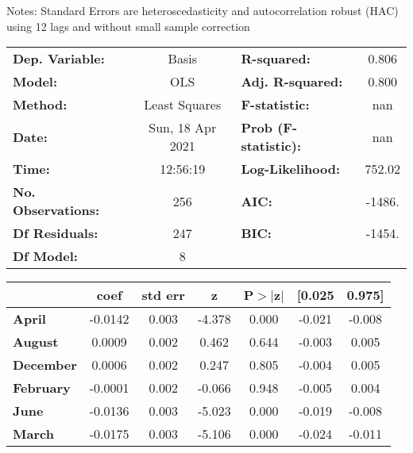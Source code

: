 Notes: \newline
 [1] Standard Errors are heteroscedasticity and autocorrelation robust (HAC) using 12 lags and without small sample correction
\begin{center}
\begin{tabular}{lclc}
\toprule
\textbf{Dep. Variable:}    &      Basis       & \textbf{  R-squared:         } &     0.806   \\
\textbf{Model:}            &       OLS        & \textbf{  Adj. R-squared:    } &     0.800   \\
\textbf{Method:}           &  Least Squares   & \textbf{  F-statistic:       } &       nan   \\
\textbf{Date:}             & Sun, 18 Apr 2021 & \textbf{  Prob (F-statistic):} &      nan    \\
\textbf{Time:}             &     12:56:19     & \textbf{  Log-Likelihood:    } &    752.02   \\
\textbf{No. Observations:} &         256      & \textbf{  AIC:               } &    -1486.   \\
\textbf{Df Residuals:}     &         247      & \textbf{  BIC:               } &    -1454.   \\
\textbf{Df Model:}         &           8      & \textbf{                     } &             \\
\bottomrule
\end{tabular}
\begin{tabular}{lcccccc}
                  & \textbf{coef} & \textbf{std err} & \textbf{z} & \textbf{P$> |$z$|$} & \textbf{[0.025} & \textbf{0.975]}  \\
\midrule
\textbf{April}    &      -0.0142  &        0.003     &    -4.378  &         0.000        &       -0.021    &       -0.008     \\
\textbf{August}   &       0.0009  &        0.002     &     0.462  &         0.644        &       -0.003    &        0.005     \\
\textbf{December} &       0.0006  &        0.002     &     0.247  &         0.805        &       -0.004    &        0.005     \\
\textbf{February} &      -0.0001  &        0.002     &    -0.066  &         0.948        &       -0.005    &        0.004     \\
\textbf{June}     &      -0.0136  &        0.003     &    -5.023  &         0.000        &       -0.019    &       -0.008     \\
\textbf{March}    &      -0.0175  &        0.003     &    -5.106  &         0.000        &       -0.024    &       -0.011     \\

\end{tabular}
\end{center}
